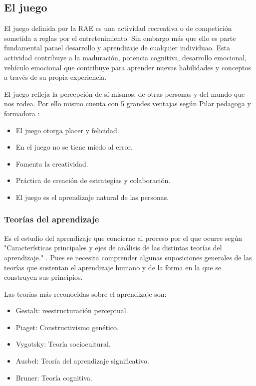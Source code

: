 \subsection{El juego}\label{juego}
El juego definida por la RAE es una actividad  recreativa o de competición sometida a reglas por el entretenimiento. Sin embargo más que ello es parte fundamental parael desarrollo y aprendizaje de cualquier individuao. Esta actividad contribuye a la maduración, potencia cognitiva, desarrollo emocional, vehículo emocional que contribuye para aprender nuevas habilidades y conceptos a través de su propia experiencia.

El juego refleja la percepción de sí mismos, de otras personas y del mundo que nos rodea. Por ello mismo cuenta con 5 grandes ventajas según Pilar pedagoga y formadora \cite{pilarjiménez2015}:
\begin{itemize}
	\item El juego otorga placer y felicidad.
	\item En el juego no se tiene miedo al error.
	\item Fomenta la creatividad.
	\item Práctica de creación de estrategias y colaboración.
	\item El juego es el aprendizaje natural de las personas.
\end{itemize}
	
\subsubsection{Teorías del aprendizaje}
Es el estudio del aprendizaje que concierne al proceso por el que ocurre según "Características principales y ejes de análisis de las distintas teorías del aprendizaje." \cite{orientaciónújar2015}. Pues se necesita comprender algunas suposiciones generales de las teorías que sustentan el aprendizaje humano y de la forma en la que se construyen sus principios.

Las teorías más reconocidas sobre el aprendizaje son:
\begin{itemize}
	\item Gestalt: reestructuración perceptual.
	\item Piaget: Constructivismo genético.
	\item Vygotsky: Teoría sociocultural.
	\item Ausbel: Teoría del aprendizaje significativo.
	\item Bruner: Teoría cognitiva.
\end{itemize}

